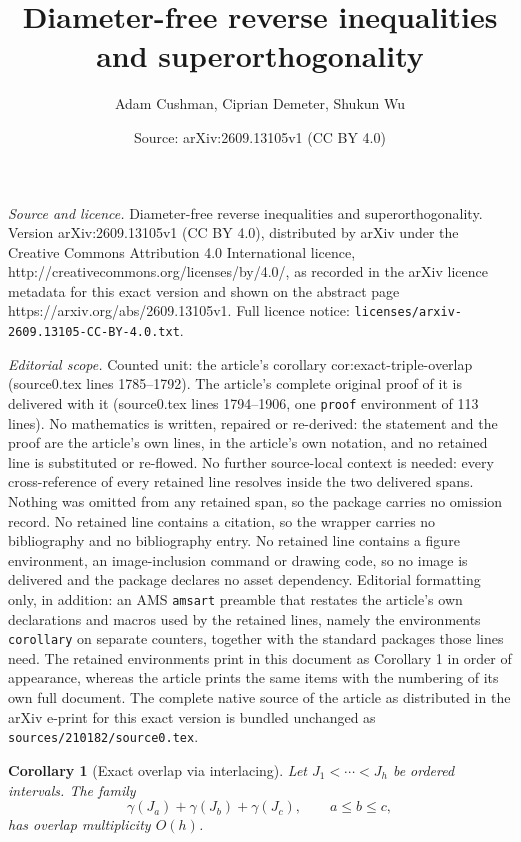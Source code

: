 \documentclass[10pt,a4paper]{amsart}
\title{Diameter-free reverse inequalities and superorthogonality}
\author{Adam Cushman, Ciprian Demeter, Shukun Wu}
\date{Source: arXiv:2609.13105v1 (CC BY 4.0)}
\newtheorem{corollary}{Corollary}
\begin{document}
\maketitle

\noindent\emph{Source and licence.} Diameter-free reverse inequalities and superorthogonality. Version arXiv:2609.13105v1 (CC BY 4.0), distributed by arXiv under the Creative Commons Attribution 4.0 International licence, http://creativecommons.org/licenses/by/4.0/, as recorded in the arXiv licence metadata for this exact version and shown on the abstract page https://arxiv.org/abs/2609.13105v1. Full licence notice: \texttt{licenses/arxiv-2609.13105-CC-BY-4.0.txt}.\par\smallskip

\noindent\textit{Editorial scope.} Counted unit: the article's corollary cor:exact-triple-overlap (source0.tex lines 1785--1792). The article's complete original proof of it is delivered with it (source0.tex lines 1794--1906, one \texttt{proof} environment of 113 lines). No mathematics is written, repaired or re-derived: the statement and the proof are the article's own lines, in the article's own notation, and no retained line is substituted or re-flowed.  No further source-local context is needed: every cross-reference of every retained line resolves inside the two delivered spans.  Nothing was omitted from any retained span, so the package carries no omission record.  No retained line contains a citation, so the wrapper carries no bibliography and no bibliography entry.  No retained line contains a figure environment, an image-inclusion command or drawing code, so no image is delivered and the package declares no asset dependency.  Editorial formatting only, in addition: an AMS \texttt{amsart} preamble that restates the article's own declarations and macros used by the retained lines, namely the environments \texttt{corollary} on separate counters, together with the standard packages those lines need.  The retained environments print in this document as Corollary 1 in order of appearance, whereas the article prints the same items with the numbering of its own full document.  The complete native source of the article as distributed in the arXiv e-print for this exact version is bundled unchanged as \texttt{sources/210182/source0.tex}.
\begin{corollary}[Exact overlap via interlacing]\label{cor:exact-triple-overlap}
Let $J_1<\cdots<J_h$ be ordered intervals.  The family
\[
 \gamma(J_a)+\gamma(J_b)+\gamma(J_c),
 \qquad a\le b\le c,
\]
has overlap multiplicity $O(h)$.
\end{corollary}
\end{document}
